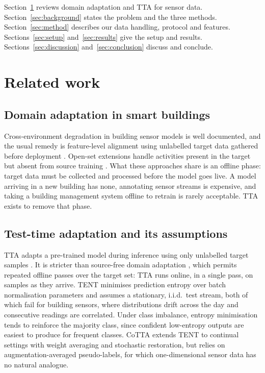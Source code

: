 \documentclass[a4paper,fleqn]{cas-dc}
\begin{document}
Section~\ref{sec:related} reviews domain adaptation and TTA for sensor data.
Section~\ref{sec:background} states the problem and the three methods.
Section~\ref{sec:method} describes our data handling, protocol and features.
Sections~\ref{sec:setup} and~\ref{sec:results} give the setup and results.
Sections~\ref{sec:discussion} and~\ref{sec:conclusion} discuss and conclude.

\section{Related work}
\label{sec:related}

\subsection{Domain adaptation in smart buildings}

Cross-environment degradation in building sensor models is well documented, and the usual
remedy is feature-level alignment using unlabelled target data gathered before deployment
\cite{dridi2022,abderrahim2025,amayri2019}. Open-set extensions handle activities present
in the target but absent from source training \cite{abderrahim2026,abderrahim_osda}. What
these approaches share is an offline phase: target data must be collected and processed
before the model goes live. A model arriving in a new building has none, annotating sensor
streams is expensive, and taking a building management system offline to retrain is rarely
acceptable. TTA exists to remove that phase.

\subsection{Test-time adaptation and its assumptions}

TTA adapts a pre-trained model during inference using only unlabelled target samples
\cite{liang2024}. It is stricter than source-free domain adaptation \cite{shot}, which
permits repeated offline passes over the target set: TTA runs online, in a single pass, on
samples as they arrive. TENT \cite{tent} minimises prediction entropy over batch
normalisation parameters and assumes a stationary, i.i.d.\ test stream, both of which
fail for building sensors, where distributions drift across the day and consecutive
readings are correlated. Under class imbalance, entropy minimisation tends to reinforce
the majority class, since confident low-entropy outputs are easiest to produce for
frequent classes. CoTTA \cite{cotta} extends TENT to continual settings with weight
averaging and stochastic restoration, but relies on augmentation-averaged pseudo-labels,
for which one-dimensional sensor data has no natural analogue.
\end{document}
